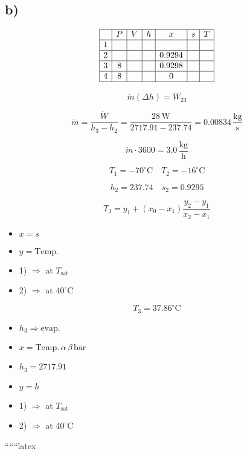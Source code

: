 

\subsection*{b)}

\[
\begin{array}{|c|c|c|c|c|c|c|}
\hline
 & P & V & h & x & s & T \\
\hline
1 &  &  &  &  &  &  \\
\hline
2 &  &  &  & 0.9294 &  &  \\
\hline
3 & 8 &  &  & 0.9298 &  &  \\
\hline
4 & 8 &  &  & 0 &  &  \\
\hline
\end{array}
\]

\[
\dot{m} (\Delta h) = \dot{W}_{23}
\]

\[
\dot{m} = \frac{\dot{W}}{h_3 - h_2} = \frac{28 \, \text{W}}{2717.91 - 237.74} = 0.00834 \, \frac{\text{kg}}{\text{s}}
\]

\[
\dot{m} \cdot 3600 = 3.0 \, \frac{\text{kg}}{\text{h}}
\]

\[
T_1 = -70^\circ \text{C} \quad T_2 = -16^\circ \text{C}
\]

\[
h_2 = 237.74 \quad s_2 = 0.9295
\]

\[
T_3 = y_1 + \left( x_0 - x_1 \right) \frac{y_2 - y_1}{x_2 - x_1}
\]

\begin{itemize}
    \item $x = s$
    \item $y = \text{Temp.}$
    \item 1) $\Rightarrow$ at $T_{\text{sat}}$
    \item 2) $\Rightarrow$ at $40^\circ \text{C}$
\end{itemize}

\[
T_3 = 37.86^\circ \text{C}
\]

\begin{itemize}
    \item $h_3 \Rightarrow \text{evap.}$
    \item $x = \text{Temp.} \, \alpha \, \beta \, \text{bar}$
    \item $h_3 = 2717.91$
    \item $y = h$
    \item 1) $\Rightarrow$ at $T_{\text{sat}}$
    \item 2) $\Rightarrow$ at $40^\circ \text{C}$
\end{itemize}

``````latex